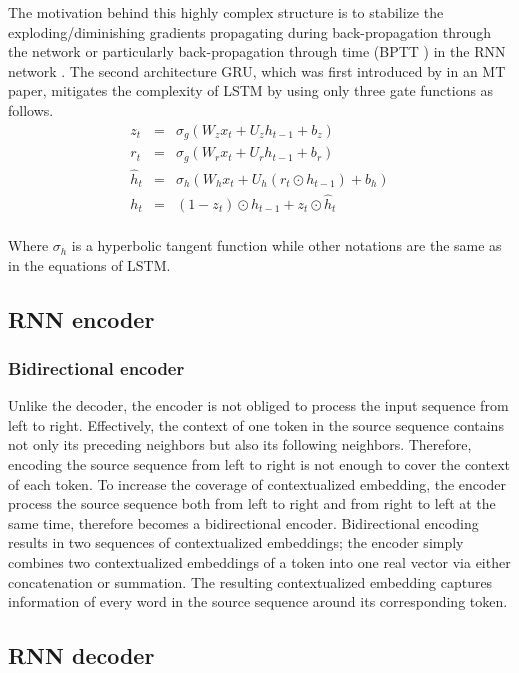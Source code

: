 The motivation behind this highly complex structure is to stabilize the exploding/diminishing gradients propagating during back-propagation through the network or particularly back-propagation through time (BPTT ) in the RNN network \citep{Pascanu13onthe}. The second architecture GRU, which was first introduced by \cite{Cho14properties} in an MT paper, mitigates the complexity of LSTM by using only three gate functions as follows.
\begin{equation}
\label{eq:gru}
\begin{array}{rcl}
z_t &=& \sigma_g (W_z x_t + U_z h_{t-1} + b_z)\\
r_t &=& \sigma_g (W_r x_t + U_r h_{t-1} + b_r)\\
\hat{h}_t &=& \sigma_h (W_h x_t + U_h (r_t \odot h_{t-1})+b_h)\\
h_t &=& (1-z_t)\odot h_{t-1} + z_t \odot \hat{h}_t\\
\end{array}
\end{equation}

Where $\sigma_h$ is a hyperbolic tangent function while other notations are the same as in the equations of LSTM.
\subsection{RNN encoder}

\subsubsection{Bidirectional encoder}
Unlike the decoder, the encoder is not obliged to process the input sequence from left to right. Effectively, the context of one token in the source sequence contains not only its preceding neighbors but also its following neighbors. Therefore, encoding the source sequence from left to right is not enough to cover the context of each token. To increase the coverage of contextualized embedding, the encoder process the source sequence both from left to right and from right to left at the same time, therefore becomes a bidirectional encoder. Bidirectional encoding results in two sequences of contextualized embeddings; the encoder simply combines two contextualized embeddings of a token into one real vector via either concatenation or summation. The resulting contextualized embedding captures information of every word in the source sequence around its corresponding token. 
\subsection{RNN decoder}
